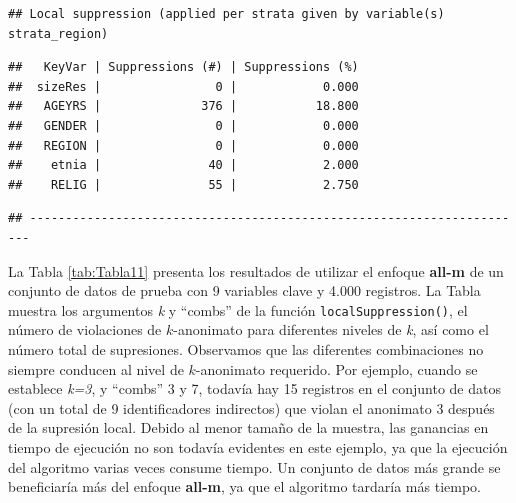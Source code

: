 \documentclass[]{book}
\theoremstyle{definition}
\theoremstyle{definition}
\theoremstyle{definition}
\theoremstyle{definition}
\theoremstyle{remark}
\begin{document}
\begin{verbatim}
## Local suppression (applied per strata given by variable(s) strata_region)
\end{verbatim}

\begin{verbatim}
##   KeyVar | Suppressions (#) | Suppressions (%)
##  sizeRes |                0 |            0.000
##   AGEYRS |              376 |           18.800
##   GENDER |                0 |            0.000
##   REGION |                0 |            0.000
##    etnia |               40 |            2.000
##    RELIG |               55 |            2.750
\end{verbatim}

\begin{verbatim}
## ----------------------------------------------------------------------
\end{verbatim}

La Tabla \ref{tab:Tabla11} presenta los resultados de utilizar el enfoque \textbf{all-m} de un conjunto de datos de prueba con 9 variables clave y 4.000 registros. La Tabla muestra los argumentos \emph{k} y ``combs'' de la función \texttt{localSuppression()}, el número de violaciones de \(k\)-anonimato para diferentes niveles de \emph{k}, así como el número total de supresiones. Observamos que las diferentes combinaciones no siempre conducen al nivel de \(k\)-anonimato requerido. Por ejemplo, cuando se establece \emph{k=3}, y ``combs'' 3 y 7, todavía hay 15 registros en el conjunto de datos (con un total de 9 identificadores indirectos) que violan el anonimato 3 después de la supresión local. Debido al menor tamaño de la muestra, las ganancias en tiempo de ejecución no son todavía evidentes en este ejemplo, ya que la ejecución del algoritmo varias veces consume tiempo. Un conjunto de datos más grande se beneficiaría más del enfoque \textbf{all-m}, ya que el algoritmo tardaría más tiempo.
\end{document}
